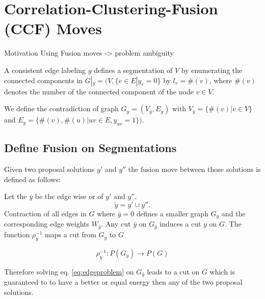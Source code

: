 \documentclass[10pt,twocolumn,letterpaper]{article}
\begin{document}
\section{Correlation-Clustering-Fusion (CCF) Moves}\label{sec:cc_fm}
Motivation Using Fusion moves -> problem ambiguity

A consistent edge labeling $y$ defines a segmentation of $V$ by enumerating the connected components 
in $G|_y=(V,\{e\in E|y_e=0\}$ by $l_v = \#(v)$, where $\#(v)$ denotes the number of the connected component of the node $v\in V$.

We define the contradiction of graph $G_y=(V_y,E_y)$
with $V_y=\{\#(v)|v\in V\}$ and $E_y=\{\#(v),\#(u)|uv\in E, y_{uv}=1\})$.

%



\subsection{Define Fusion on Segmentations}

Given two proposal solutions $y'$ and $y''$
the fusion move between those solutions is defined
as follows:

Let the $\bar{y}$ be the edge wise or of  $y'$ and $y''$.
\begin{equation}
\breve{y} =  y' \cup y''.
\end{equation}
Contraction of all edges in $G$ where $\bar{y}=0$ defines
a smaller graph $G_{\bar{y}}$ and the corresponding
edge weights $W_{\hat{y}}$.
Any cut $\bar{y}$ on $G_{\hat{y}}$ induces a cut $y$ on $G$.
The function 
$\rho_y^{-1}$ maps a cut from $G_{\hat{y}}$  to $G$ 

\begin{equation}
   \rho_y^{-1} : P(G_y) \to P(G)
\end{equation}

Therefore solving eq. \ref{eq:edgeproblem} 
on $G_{\hat{y}}$
leads to a cut on $G$ which is guaranteed to 
to have a better or equal energy
then any of the two proposal solutions.




\end{document}
